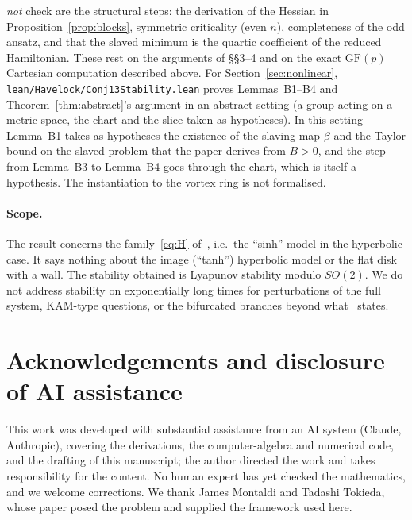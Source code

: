 \documentclass[11pt]{article}
\theoremstyle{definition}
\theoremstyle{remark}
\begin{document}
\emph{not} check are the structural steps: the derivation of the Hessian in Proposition~\ref{prop:blocks},
symmetric criticality (even $n$), completeness of the odd ansatz, and that the slaved minimum is the quartic
coefficient of the reduced Hamiltonian. These rest on the arguments of
\S\S3--4 and on the exact $\mathrm{GF}(p)$ Cartesian computation described above.
For Section~\ref{sec:nonlinear}, \texttt{lean/Havelock/Conj13Stability.lean} proves Lemmas~B1--B4 and
Theorem~\ref{thm:abstract}'s argument in an abstract setting (a group acting on a metric space, the chart and the
slice taken as hypotheses). In this setting Lemma~B1 takes as hypotheses the existence of the slaving map
$\beta$ and the Taylor bound on the slaved problem that the paper derives from $B>0$, and the step from
Lemma~B3 to Lemma~B4 goes through the chart, which is itself a hypothesis. The instantiation to the vortex
ring is not formalised.

\paragraph{Scope.} The result concerns the family~\eqref{eq:H} of~\cite{MT}, i.e.\ the ``sinh'' model in
the hyperbolic case. It says nothing about the image (``tanh'') hyperbolic model or the flat disk with a
wall. The stability obtained is Lyapunov stability modulo $SO(2)$. We do not address stability on
exponentially long times for perturbations of the full system, KAM-type questions, or the bifurcated
branches beyond what~\cite[Remark~11]{MT} states.

\section*{Acknowledgements and disclosure of AI assistance}
This work was developed with substantial assistance from an AI system (Claude, Anthropic), covering the
derivations, the computer-algebra and numerical code, and the drafting of this manuscript; the author
directed the work and takes responsibility for the content. No human expert has yet checked the
mathematics, and we welcome corrections. We thank James Montaldi and Tadashi Tokieda, whose paper posed
the problem and supplied the framework used here.



\end{document}
